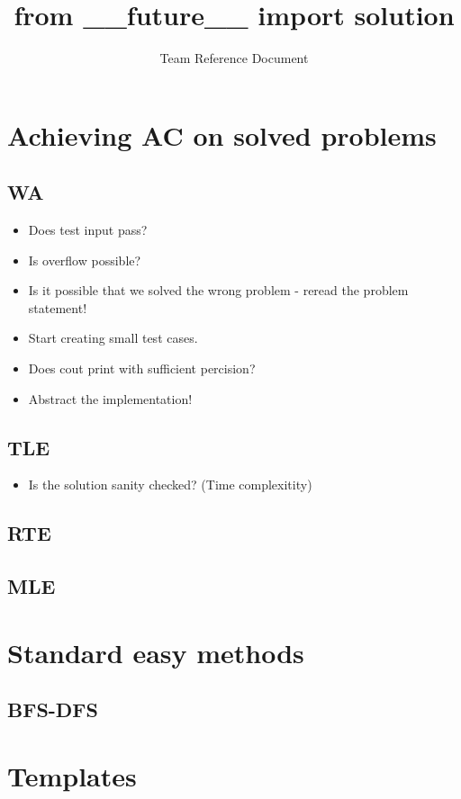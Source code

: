\documentclass[8pt,a4paper,landscape,oneside]{amsart}
\title{from \_\_future\_\_ import solution}
\subtitle{Team Reference Document}
\author{}
\date{\ddmmyyyydate{\today{}}}
\begin{document}
\begin{multicols*}{2}
\maketitle
\thispagestyle{fancy}
\vspace{-3em}

\tableofcontents
\begin{large}
\section{Achieving AC on solved problems}
\subsection{WA}
\begin{itemize}
    \item Does test input pass?
    \item Is overflow possible?
    \item Is it possible that we solved the wrong problem - reread the problem statement!
    \item Start creating small test cases.
    \item Does cout print with sufficient percision?
    \item Abstract the implementation!
\end{itemize}
\subsection{TLE}
\begin{itemize}
    \item Is the solution sanity checked? (Time complexitity)
\end{itemize}
\subsection{RTE}
\subsection{MLE}
\section{Standard easy methods}
\subsection{BFS-DFS}
\section{Templates}

\end{large}
\end{multicols*}
\end{document}
